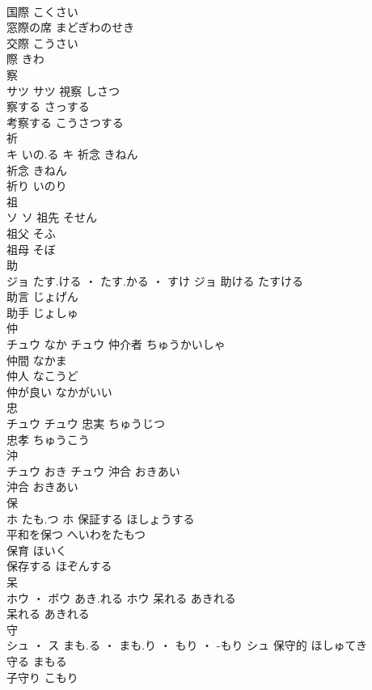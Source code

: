 \documentclass[8pt]{extreport}
\begin{document}
\begin{CJK}{UTF8}{min}
\\	国際	こくさい	
\\	窓際の席	まどぎわのせき	
\\	交際	こうさい	
\\	際	きわ	
\\	察	
\\	サツ		サツ	視察	しさつ	
\\	察する	さっする	
\\	考察する	こうさつする	
\\	祈	
\\	キ	いの.る	キ	祈念	きねん	
\\	祈念	きねん	
\\	祈り	いのり	
\\	祖	
\\	ソ		ソ	祖先	そせん	
\\	祖父	そふ	
\\	祖母	そぼ	
\\	助	
\\	ジョ	たす.ける ・ たす.かる ・ すけ	ジョ	助ける	たすける	
\\	助言	じょげん	
\\	助手	じょしゅ	
\\	仲	
\\	チュウ	なか	チュウ	仲介者	ちゅうかいしゃ	
\\	仲間	なかま	
\\	仲人	なこうど	
\\	仲が良い	なかがいい	
\\	忠	
\\	チュウ		チュウ	忠実	ちゅうじつ	
\\	忠孝	ちゅうこう	
\\	沖	
\\	チュウ	おき	チュウ	沖合	おきあい	
\\	沖合	おきあい	
\\	保	
\\	ホ	たも.つ	ホ	保証する	ほしょうする	
\\	平和を保つ	へいわをたもつ	
\\	保育	ほいく	
\\	保存する	ほぞんする	
\\	呆	
\\	ホウ ・ ボウ	あき.れる	ホウ	呆れる	あきれる	
\\	呆れる	あきれる	
\\	守	
\\	シュ ・ ス	まも.る ・ まも.り ・ もり ・ -もり	シュ	保守的	ほしゅてき	
\\	守る	まもる	
\\	子守り	こもり	

\end{CJK}
\end{document}
